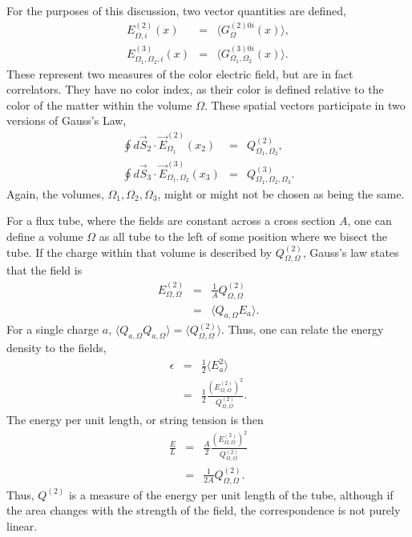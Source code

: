 \documentclass[aps, prc, 12pt, nofootinbib, showpacs, superscriptaddress, tightenlines, groupedaddress]{revtex4-2}
\begin{document}
For the purposes of this discussion, two vector quantities are defined,
\begin{eqnarray}
E^{(2)}_{\Omega,i}(x)&=&\langle G^{(2)0i}_{\Omega}(x)\rangle,\\
\nonumber
E^{(3)}_{\Omega_1,\Omega_2,i}(x)&=&\langle G^{(3)0i}_{\Omega_1,\Omega_2}(x)\rangle.
\end{eqnarray}
These represent two measures of the color electric field, but are in fact correlators. They have no color index, as their color is defined relative to the color of the matter within the volume $\Omega$. These spatial vectors participate in two versions of Gauss's Law,
\begin{eqnarray}\label{eq:gauss}
 \oint d\vec{S}_2\cdot\vec{E}^{(2)}_{\Omega_1}(x_2)&=&Q^{(2)}_{\Omega_1,\Omega_2},\\
 \nonumber
 \oint d\vec{S}_3\cdot\vec{E}^{(3)}_{\Omega_1,\Omega_2}(x_3)&=&Q^{(3)}_{\Omega_1,\Omega_2,\Omega_3}.
\end{eqnarray}
Again, the volumes, $\Omega_1,\Omega_2,\Omega_3$, might or might not be chosen as being the same.

For a flux tube, where the fields are constant across a cross section $A$, one can define a volume $\Omega$ as all tube to the left of some position where we bisect the tube. If the charge within that volume is described by $Q^{(2)}_{\Omega,\Omega}$, Gauss's law states that the field is 
\begin{eqnarray}
E^{(2)}_{\Omega,\Omega}&=&\frac{1}{A}Q^{(2)}_{\Omega,\Omega}\\
\nonumber
&=&\langle Q_{a,\Omega}E_a\rangle.
\end{eqnarray}
For a single charge $a$, $\langle Q_{a,\Omega}Q_{a,\Omega}\rangle=\langle Q^{(2)}_{\Omega,\Omega}\rangle$. Thus, one can relate the energy density to the fields,
\begin{eqnarray}
 \epsilon&=&\frac{1}{2}\langle E_a^2\rangle\\
 \nonumber
 &=&\frac{1}{2}\frac{(E^{(2)}_{\Omega,\Omega})^2}{Q^{(2)}_{\Omega,\Omega}}.
\end{eqnarray}
The energy per unit length, or string tension is then
\begin{eqnarray}\label{eq:tension}
\frac{E}{L}&=&\frac{A}{2}\frac{(E^{(2)}_{\Omega,\Omega})^2}{Q^{(2)}_{\Omega,\Omega}}\\
\nonumber
&=&\frac{1}{2A}Q^{(2)}_{\Omega,\Omega}.
\end{eqnarray}
Thus, $Q^{(2)}$ is a measure of the energy per unit length of the tube, although if the area changes with the strength of the field, the correspondence is not purely linear.
\end{document}
